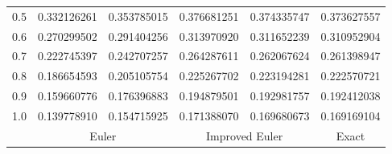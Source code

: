 \begin{examplesolution}
\begin{newtable}
\begin{center}
\begin{tabular}{|c|r|r|r|r|r|}
      0.5                       & 0.332126261                   & 0.353785015                         & 0.376681251                   & 0.374335747                    & 0.373627557                 \\
      0.6                       & 0.270299502                   & 0.291404256                         & 0.313970920                   & 0.311652239                    & 0.310952904                 \\
      0.7                       & 0.222745397                   & 0.242707257                         & 0.264287611                   & 0.262067624                    & 0.261398947                 \\
      0.8                       & 0.186654593                   & 0.205105754                         & 0.225267702                   & 0.223194281                    & 0.222570721                 \\
      0.9                       & 0.159660776                   & 0.176396883                         & 0.194879501                   & 0.192981757                    & 0.192412038                 \\
      1.0                       & 0.139778910                   & 0.154715925                         & 0.171388070                   & 0.169680673                    & 0.169169104                 \\
      \hline
                                & \multicolumn{2}{c|}{Euler}    & \multicolumn{2}{c|}{Improved Euler} & \multicolumn{1}{c|}{Exact}     \\
      \hline
    \end{tabular}
  \end{center}
\end{newtable}
\end{examplesolution}

